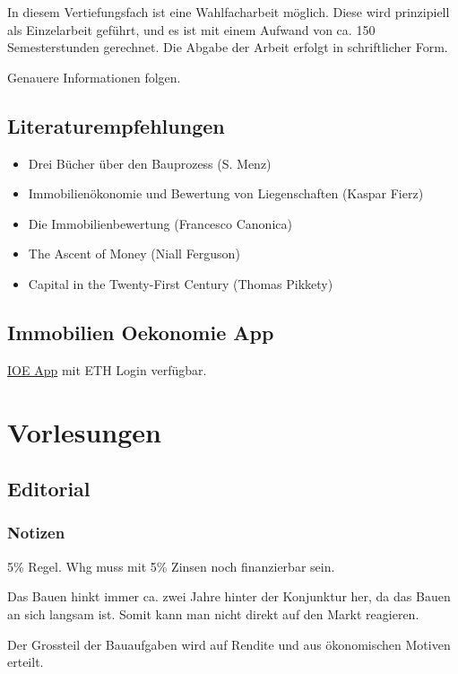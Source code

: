 \documentclass[11pt]{article}
\begin{document}
In diesem Vertiefungsfach ist eine Wahlfacharbeit möglich. Diese wird
prinzipiell als Einzelarbeit geführt, und es ist mit einem Aufwand von
ca. 150 Semesterstunden gerechnet. Die Abgabe der Arbeit erfolgt in
schriftlicher Form.

Genauere Informationen folgen.

\subsection{Literaturempfehlungen}
\label{sec-1-3}

\begin{itemize}
\item Drei Bücher über den Bauprozess (S. Menz)
\item Immobilienökonomie und Bewertung von Liegenschaften (Kaspar Fierz)
\item Die Immobilienbewertung (Francesco Canonica)
\item The Ascent of Money (Niall Ferguson)
\item Capital in the Twenty-First Century (Thomas Pikkety)
\end{itemize}

\subsection{Immobilien Oekonomie App}
\label{sec-1-4}

\href{https://ioe-app.ethz.ch}{IOE App} mit ETH Login verfügbar.

\section{Vorlesungen}
\label{sec-2}

\subsection{Editorial}
\label{sec-2-1}

\subsubsection{Notizen}
\label{sec-2-1-1}

5\% Regel. Whg muss mit 5\% Zinsen noch finanzierbar sein.

Das Bauen hinkt immer ca. zwei Jahre hinter der Konjunktur her, da das Bauen
an sich langsam ist. Somit kann man nicht direkt auf den Markt reagieren.

Der Grossteil der Bauaufgaben wird auf Rendite und aus ökonomischen Motiven
erteilt.
\end{document}
